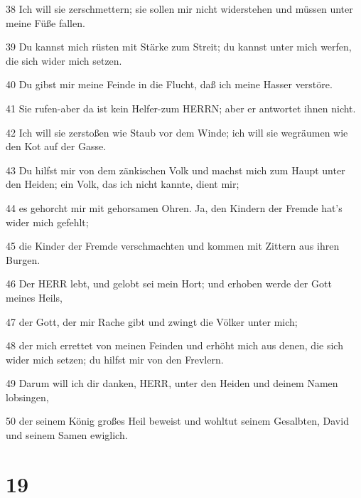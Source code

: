\par 38 Ich will sie zerschmettern; sie sollen mir nicht widerstehen und müssen unter meine Füße fallen.
\par 39 Du kannst mich rüsten mit Stärke zum Streit; du kannst unter mich werfen, die sich wider mich setzen.
\par 40 Du gibst mir meine Feinde in die Flucht, daß ich meine Hasser verstöre.
\par 41 Sie rufen-aber da ist kein Helfer-zum HERRN; aber er antwortet ihnen nicht.
\par 42 Ich will sie zerstoßen wie Staub vor dem Winde; ich will sie wegräumen wie den Kot auf der Gasse.
\par 43 Du hilfst mir von dem zänkischen Volk und machst mich zum Haupt unter den Heiden; ein Volk, das ich nicht kannte, dient mir;
\par 44 es gehorcht mir mit gehorsamen Ohren. Ja, den Kindern der Fremde hat's wider mich gefehlt;
\par 45 die Kinder der Fremde verschmachten und kommen mit Zittern aus ihren Burgen.
\par 46 Der HERR lebt, und gelobt sei mein Hort; und erhoben werde der Gott meines Heils,
\par 47 der Gott, der mir Rache gibt und zwingt die Völker unter mich;
\par 48 der mich errettet von meinen Feinden und erhöht mich aus denen, die sich wider mich setzen; du hilfst mir von den Frevlern.
\par 49 Darum will ich dir danken, HERR, unter den Heiden und deinem Namen lobsingen,
\par 50 der seinem König großes Heil beweist und wohltut seinem Gesalbten, David und seinem Samen ewiglich.

\chapter{19}

